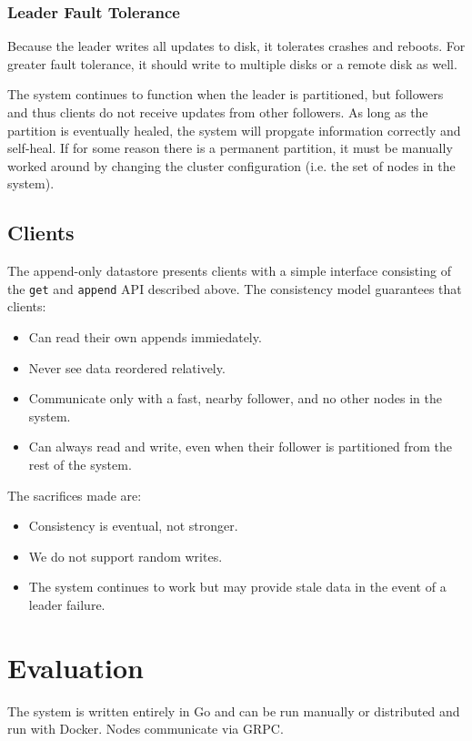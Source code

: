 \documentclass[11pt,english,twocolumn]{article}
\begin{document}
\subsubsection{Leader Fault Tolerance}
Because the leader writes all updates to disk, it tolerates crashes and reboots.
For greater fault tolerance, it should write to multiple disks or a remote disk
as well.

The system continues to function when the leader is partitioned, but followers
and thus clients do not receive updates from other followers. As long as the
partition is eventually healed, the system will propgate information correctly
and self-heal. If for some reason there is a permanent partition, it must be
manually worked around by changing the cluster configuration (i.e. the set of
nodes in the system).

\subsection{Clients}
The append-only datastore presents clients with a simple interface consisting of
the \texttt{get} and \texttt{append} API described above. The consistency model
guarantees that clients:

\begin{itemize}
	\item Can read their own appends immiedately.
	\item Never see data reordered relatively.
	\item Communicate only with a fast, nearby follower, and no other nodes
		in the system.
	\item Can always read and write, even when their follower is partitioned
		from the rest of the system.
\end{itemize}

The sacrifices made are:

\begin{itemize}
	\item Consistency is eventual, not stronger.
	\item We do not support random writes.
	\item The system continues to work but may provide stale data in the
		event of a leader failure.
\end{itemize}

\section{Evaluation}
The system is written entirely in Go and can be run manually or distributed and
run with Docker. Nodes communicate via GRPC.
\end{document}

